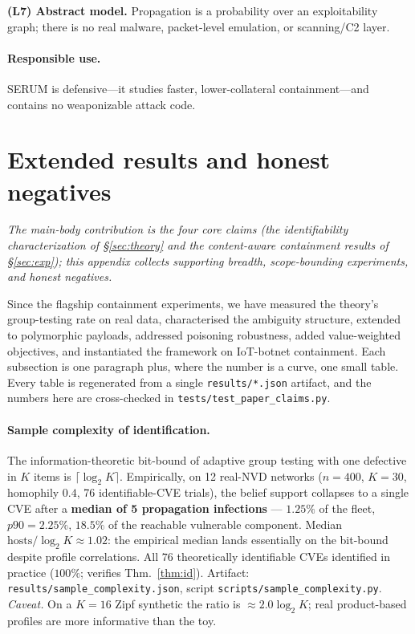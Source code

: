 \documentclass[11pt]{article}
\begin{document}
\textbf{(L7) Abstract model.} Propagation is a probability over an exploitability
graph; there is no real malware, packet-level emulation, or scanning/C2 layer.

\paragraph{Responsible use.} SERUM is defensive---it studies faster,
lower-collateral containment---and contains no weaponizable attack code.

\appendix
\section{Extended results and honest negatives}\label{sec:extended}
\emph{The main-body contribution is the four core claims (the identifiability
characterization of \S\ref{sec:theory} and the content-aware containment results
of \S\ref{sec:exp}); this appendix collects supporting breadth, scope-bounding
experiments, and honest negatives.}

Since the flagship containment experiments, we have measured the theory's group-testing
rate on real data, characterised the ambiguity structure, extended to polymorphic
payloads, addressed poisoning robustness, added value-weighted objectives, and
instantiated the framework on IoT-botnet containment. Each subsection is one
paragraph plus, where the number is a curve, one small table. Every table is
regenerated from a single \texttt{results/*.json} artifact, and the numbers here
are cross-checked in \texttt{tests/test\_paper\_claims.py}.

\paragraph{Sample complexity of identification.}
The information-theoretic bit-bound of adaptive group testing with one defective
in $K$ items is $\lceil\log_2 K\rceil$. Empirically, on 12 real-NVD networks
($n{=}400$, $K{=}30$, homophily $0.4$, 76 identifiable-CVE trials), the belief
support collapses to a single CVE after a \textbf{median of 5 propagation
infections} --- $1.25\%$ of the fleet, $p90{=}2.25\%$, $18.5\%$ of the reachable
vulnerable component. Median $\text{hosts}/\log_2 K\approx 1.02$: the empirical
median lands essentially on the bit-bound despite profile correlations. All $76$
theoretically identifiable CVEs identified in practice ($100\%$; verifies
Thm.~\ref{thm:id}). Artifact: \texttt{results/sample\_complexity.json}, script
\texttt{scripts/sample\_complexity.py}. \emph{Caveat.} On a $K{=}16$ Zipf
synthetic the ratio is $\approx\!2.0\log_2 K$; real product-based profiles are
more informative than the toy.
\end{document}
